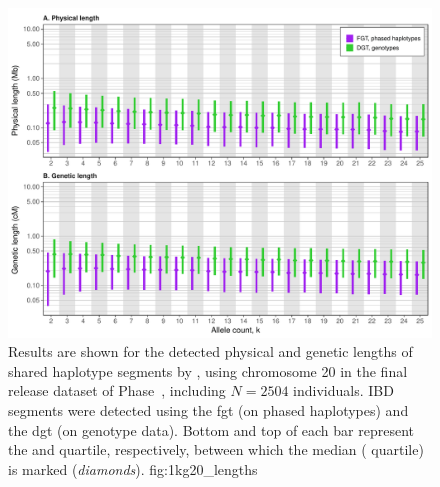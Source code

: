 

\begin{figure}[!htbp]
\includegraphics[width=\textwidth]{./img/ch3/length_1kg20}
{Results are shown for the detected physical and genetic lengths of shared haplotype segments by \fk{}, using chromosome 20 in the final release dataset of  Phase~, including ${N = \num{2504}}$ individuals.
IBD segments were detected using the \gls{fgt} (on phased haplotypes) and the \gls{dgt} (on genotype data).
Bottom and top of each bar represent the  and  quartile, respectively, between which the median ( quartile) is marked (\emph{diamonds}).}
{fig:1kg20_lengths}
\end{figure}
